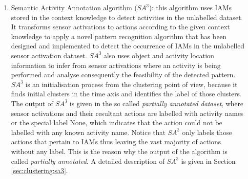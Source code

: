 \begin{enumerate}
 \item Semantic Activity Annotation algorithm ($SA^3$): this algorithm uses IAMs stored in the context knowledge to detect activities in the unlabelled dataset. It transforms sensor activations to actions according to the given context knowledge to apply a novel pattern recognition algorithm that has been designed and implemented to detect the occurrence of IAMs in the unlabelled sensor activation dataset. $SA^3$ also uses object and activity location information to infer from sensor activations where an activity is being performed and analyse consequently the feasibility of the detected pattern. $SA^3$ is an initialisation process from the clustering point of view, because it finds initial clusters in the time axis and identifies the label of those clusters. The output of $SA^3$ is given in the so called \textit{partially annotated dataset}, where sensor activations and their resultant actions are labelled with activity names or the special label None, which indicates that the action could not be labelled with any known activity name. Notice that $SA^3$ only labels those actions that pertain to IAMs thus leaving the vast majority of actions without any label. This is the reason why the output of the algorithm is called \textit{partially annotated}. A detailed description of $SA^3$ is given in Section \ref{sec:clustering:sa3}.

\end{enumerate}

